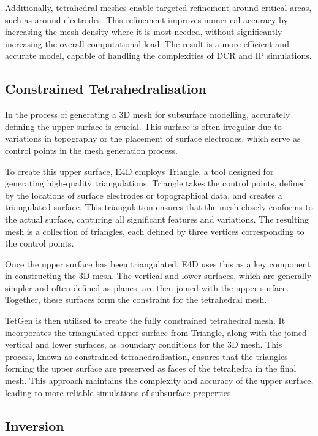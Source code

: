 \documentclass[a4paper,12pt]{article}
\begin{document}
Additionally, tetrahedral meshes enable targeted refinement around critical
areas, such as around electrodes. This refinement improves numerical accuracy
by increasing the mesh density where it is most needed, without significantly
increasing the overall computational load. The result is a more efficient and
accurate model, capable of handling the complexities of DCR and IP simulations.

\subsection{Constrained Tetrahedralisation}

In the process of generating a 3D mesh for subsurface modelling, accurately
defining the upper surface is crucial. This surface is often irregular due to
variations in topography or the placement of surface electrodes, which serve as
control points in the mesh generation process.

To create this upper surface, E4D employs Triangle, a tool designed for
generating high-quality triangulations. Triangle takes the control points,
defined by the locations of surface electrodes or topographical data, and
creates a triangulated surface. This triangulation ensures that the mesh
closely conforms to the actual surface, capturing all significant features and
variations. The resulting mesh is a collection of triangles, each defined by
three vertices corresponding to the control points.

Once the upper surface has been triangulated, E4D uses this as a key component
in constructing the 3D mesh. The vertical and lower surfaces, which are
generally simpler and often defined as planes, are then joined with the upper
surface. Together, these surfaces form the constraint for the tetrahedral mesh.

TetGen is then utilised to create the fully constrained tetrahedral mesh. It
incorporates the triangulated upper surface from Triangle, along with the
joined vertical and lower surfaces, as boundary conditions for the 3D mesh.
This process, known as constrained tetrahedralisation, ensures that the
triangles forming the upper surface are preserved as faces of the tetrahedra in
the final mesh. This approach maintains the complexity and accuracy of the
upper surface, leading to more reliable simulations of subsurface properties.

\subsection{Inversion}
\end{document}
